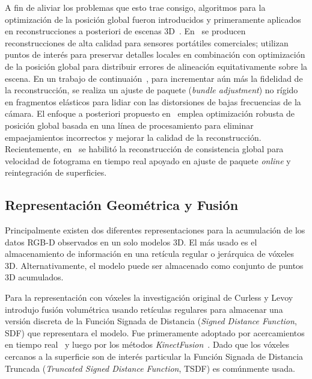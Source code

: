 A fin de aliviar los problemas que esto trae consigo, algoritmos para la optimización de la posición global fueron introducidos y primeramente aplicados en reconstrucciones a posteriori de escenas 3D~\cite{zhou2013dense,zhou2013elastic}. En~\cite{zhou2013dense} se producen reconstrucciones de alta calidad para sensores portátiles comerciales; utilizan puntos de interés para preservar detalles locales en combinación con optimización de la posición global para distribuir errores de alineación equitativamente sobre la escena. En un trabajo de continuaión~\cite{zhou2013elastic}, para incrementar aún más la fidelidad de la reconstrucción, se realiza un ajuste de paquete (\textit{bundle adjustment}) no rígido en fragmentos elásticos para lidiar con las distorsiones de bajas frecuencias de la cámara. El enfoque a posteriori propuesto en~\cite{choi2015robust} emplea optimización robusta de posición global basada en una línea de procesamiento para eliminar empaejamientos incorrectos y mejorar la calidad de la reconstrucción. Recientemente, en~\cite{dai2017bundlefusion} se habilitó la reconstrucción de consistencia global para velocidad de fotograma en tiempo real apoyado en ajuste de paquete \textit{online} y reintegración de superficies.

\subsection{Representación Geométrica y Fusión}

Principalmente existen dos diferentes representaciones para la acumulación de los datos RGB-D observados en un solo modelos 3D. El más usado es el almacenamiento de información en una retícula regular o jerárquica de vóxeles 3D. Alternativamente, el modelo puede ser almacenado como conjunto de puntos 3D acumulados.

Para la representación con vóxeles la investigación original de Curless y Levoy~\cite{curless1996volumetric} introdujo fusión volumétrica usando retículas regulares para almacenar una versión discreta de la Función Signada de Distancia (\textit{Signed Distance Function}, SDF) que representara el modelo. Fue primeramente adoptado por acercamientos en tiempo real~\cite{rusinkiewicz2002real} y luego por los métodos \textit{KinectFusion}~\cite{izadi2011kinectfusion}. Dado que los vóxeles cercanos a la superficie son de interés particular la Función Signada de Distancia Truncada (\textit{Truncated Signed Distance Function}, TSDF) es comúnmente usada.

